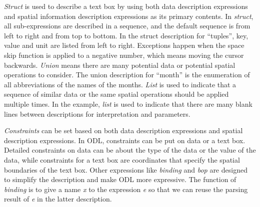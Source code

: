 {%
{\em Struct} is used to describe a text box by using both data description 
expressions and spatial information description expressions as its primary contents. 
In {\em struct}, all sub-expressions are described in a sequence, 
and the default sequence is from left to right and from top to bottom. In the struct description for ``tuples'', key, value and unit are listed from left to right. 
Exceptions happen when the space skip function is applied to a negative number, which means moving the cursor backwards. 
{\em Union} means there are many potential data or potential spatial operations to consider. The union description for ``month'' is the enumeration of all abbreviations of the names of the months.
{\em List} is used to indicate that a sequence of similar data or the same spatial operations should be applied multiple times. In the example, {\em list} is used to indicate that there are many blank lines between descriptions for interpretation and parameters.

{\em Constraints} can  
be set based on both data description expressions and 
spatial description expressions. In ODL, constraints can be put on 
data or a text box. 
Detailed constraints on data can be about the 
type of the data or the value of the data, while constraints for a
text box are coordinates that specify the spatial boundaries of the text box. 
Other expressions like {\em binding} and {\em bop} are designed to 
simplify the description and make ODL more expressive. 
The function of {\em binding} is to give a name {\em x} to 
the expression {\em e} so that we can reuse the parsing result of {\em e} 
in the latter description. 


}
